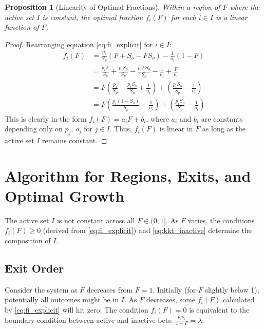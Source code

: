 \documentclass[11pt, letterpaper]{article}
\newtheorem{proposition}{Proposition}
\theoremstyle{definition}
\begin{document}
\begin{proposition}[Linearity of Optimal Fractions]
Within a region of $F$ where the active set $I$ is constant, the optimal fraction $f_i(F)$ for each $i \in I$ is a linear function of $F$.
\end{proposition}
\begin{proof}
Rearranging equation \eqref{eq:fi_explicit} for $i \in I$:
\begin{align*}
    f_i(F) &= \frac{p_i}{S_p} (F + S_o - F S_o) - \frac{1}{o_i} (1 - F) \\
           &= \frac{p_i F}{S_p} + \frac{p_i S_o}{S_p} - \frac{p_i F S_o}{S_p} - \frac{1}{o_i} + \frac{F}{o_i} \\
           &= F \left( \frac{p_i}{S_p} - \frac{p_i S_o}{S_p} + \frac{1}{o_i} \right) + \left( \frac{p_i S_o}{S_p} - \frac{1}{o_i} \right) \\
           &= F \left( \frac{p_i(1 - S_o)}{S_p} + \frac{1}{o_i} \right) + \left( \frac{p_i S_o}{S_p} - \frac{1}{o_i} \right)
\end{align*}
This is clearly in the form $f_i(F) = a_i F + b_i$, where $a_i$ and $b_i$ are constants depending only on $p_j$, $o_j$ for $j \in I$. Thus, $f_i(F)$ is linear in $F$ as long as the active set $I$ remains constant.
\end{proof}

\section{Algorithm for Regions, Exits, and Optimal Growth}
\label{sec:algorithm}

The active set $I$ is not constant across all $F \in (0, 1]$. As $F$ varies, the conditions $f_i(F) \ge 0$ (derived from \eqref{eq:fi_explicit}) and \eqref{eq:kkt_inactive} determine the composition of $I$.

\subsection{Exit Order}

Consider the system as $F$ decreases from $F=1$. Initially (for $F$ slightly below 1), potentially all outcomes might be in $I$. As $F$ decreases, some $f_i(F)$ calculated by \eqref{eq:fi_explicit} will hit zero. The condition $f_i(F)=0$ is equivalent to the boundary condition between active and inactive bets:
$\frac{p_i o_i}{1 - F} = \lambda$.
\end{document}
